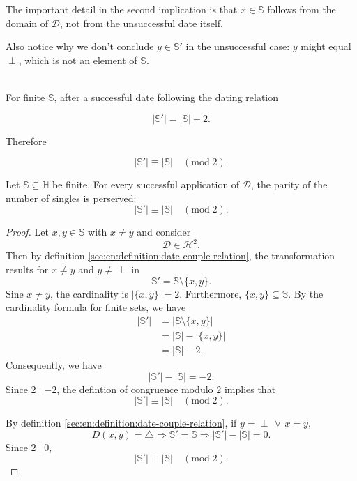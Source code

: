 \begin{corollary}
    The important detail in the second implication is that $x\in\mathbb S$ follows from the domain of $\mathcal D$, not from the unsuccessful date itself.
    
    Also notice why we don't conclude $y\in\mathbb S'$ in the unsuccessful case: $y$ might equal $\perp$, which is not an element of $\mathbb S$.
\end{corollary}

\begin{theorem}\label{sec:en:theorem:conservation-of-singleness-parity}
    \leavevmode\\
    For finite $\mathbb{S}$, after a successful date following the dating relation
    
    $$|\mathbb{S}'|=|\mathbb{S}|-2.$$
    
    Therefore
    
    $$ |\mathbb{S}'|\equiv|\mathbb{S}| \quad (\mathrm{mod}\;2).$$

    \begin{statement}
        Let $\mathbb{S}\subseteq\mathbb{H}$ be finite. For every successful application of $\mathcal{D}$, the parity of the number of singles is perserved:
        $$|\mathbb{S}'|\equiv|\mathbb{S}| \quad (\mathrm{mod}\;2).$$
    \end{statement}

    \begin{proof}
        Let $x,y\in\mathbb{S}$ with $x\neq y$ and consider
        $$\mathcal{D}\in\mathcal{H}^2.$$
        Then by definition \ref{sec:en:definition:date-couple-relation}, the transformation results for $x\neq y$ and $y\neq\perp$ in
        $$\mathbb{S}'=\mathbb{S}\setminus\{x,y\}.$$
        Sine $x\neq y$, the cardinality is $|\{x,y\}|=2$.
        Furthermore, $\{x,y\}\subseteq\mathbb{S}$. By the cardinality formula for finite sets, we have
        \begin{align*}
            |\mathbb{S}'| &= |\mathbb{S}\setminus\{x,y\}| \\
            &= |\mathbb{S}| - |\{x,y\}| \\
            &= |\mathbb{S}| - 2.
        \end{align*}
        Consequently, we have
        $$|\mathbb{S}'|-|\mathbb{S}| = -2.$$
        Since $2 \mid -2$, the defintion of congruence modulo $2$ implies that
        $$|\mathbb{S}'|\equiv|\mathbb{S}| \quad (\mathrm{mod}\;2).$$

        By definition \ref{sec:en:definition:date-couple-relation}, if $y=\perp \,\lor\, x=y$,
        $$D(x,y)=\triangle \Longrightarrow \mathbb{S}'=\mathbb{S} \Longrightarrow |\mathbb{S}'|-|\mathbb{S}|=0.$$
        Since $2 \mid 0$,
        $$|\mathbb{S}'|\equiv|\mathbb{S}| \quad (\mathrm{mod}\;2).$$
    \end{proof}
\end{theorem}



